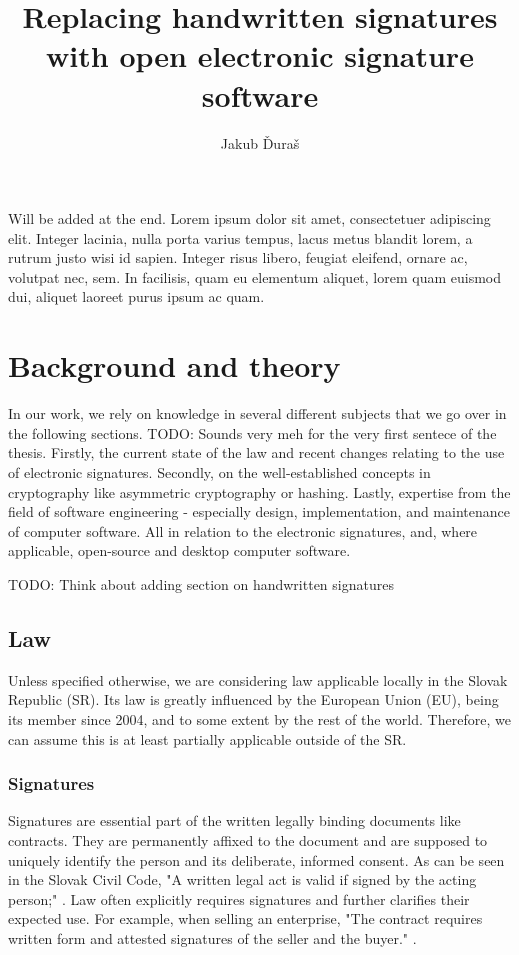 \documentclass[thesismargins, english, thesislinespacing, twoside, openright, upjsfrontpage]{rnthesis}
\title{Replacing handwritten signatures with open electronic signature software}
\author{Jakub Ďuraš}
\begin{document}
\maketitle
\newpage
\tableofcontents
\listoffigures
\listoftables

\uvod

Will be added at the end. Lorem ipsum dolor sit amet, consectetuer adipiscing elit.
Integer lacinia, nulla porta varius tempus, lacus metus blandit
lorem, a rutrum justo wisi id sapien. Integer risus libero,
feugiat eleifend, ornare ac, volutpat nec, sem. In facilisis,
quam eu elementum aliquet, lorem quam euismod dui, aliquet
laoreet purus ipsum ac quam.

\chapter{Background and theory}

In our work, we rely on knowledge in several different subjects that we go over in the following sections.
TODO: Sounds very meh for the very first sentece of the thesis.
Firstly, the current state of the law and recent changes relating to the use of electronic signatures.
Secondly, on the well-established concepts in cryptography like asymmetric cryptography or hashing.
Lastly, expertise from the field of software engineering - especially design, implementation, and maintenance of computer software.
All in relation to the electronic signatures, and, where applicable, open-source and desktop computer software.

TODO: Think about adding section on handwritten signatures

\section{Law}

Unless specified otherwise, we are considering law applicable locally in the Slovak Republic (SR).
Its law is greatly influenced by the European Union (EU), being its member since 2004, and to some extent by the rest of the world.
Therefore, we can assume this is at least partially applicable outside of the SR.

\subsection{Signatures}

Signatures are essential part of the written legally binding documents like contracts.
They are permanently affixed to the document and are supposed to uniquely identify the person and its deliberate, informed consent.
As can be seen in the Slovak Civil Code, "A written legal act is valid if signed by the acting person;" \cite{civilcode}.
Law often explicitly requires signatures and further clarifies their expected use.
For example, when selling an enterprise, "The contract requires written form and attested signatures of the seller and the buyer." \cite{civilcode}.
\end{document}
